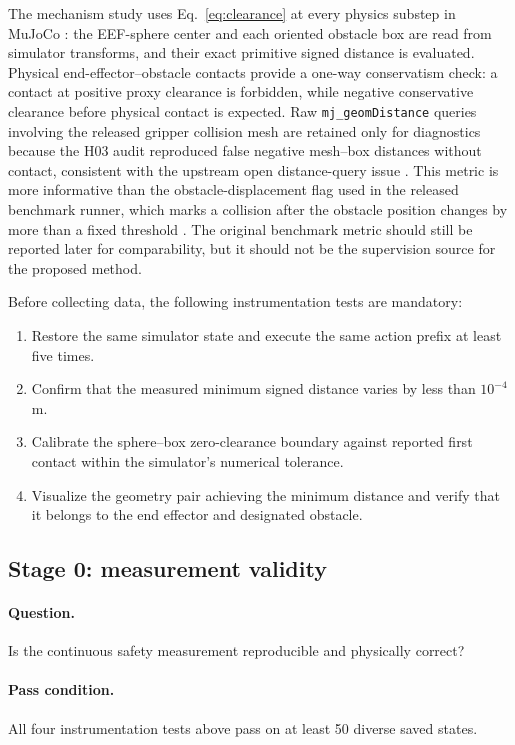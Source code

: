 \documentclass[10pt,conference]{IEEEtran}
\newcommand{\1}{\mathbf{1}}
\begin{document}
The mechanism study uses Eq.~\eqref{eq:clearance} at every physics substep in MuJoCo \cite{todorov2012mujoco}: the EEF-sphere center and each oriented obstacle box are read from simulator transforms, and their exact primitive signed distance is evaluated. Physical end-effector--obstacle contacts provide a one-way conservatism check: a contact at positive proxy clearance is forbidden, while negative conservative clearance before physical contact is expected. Raw \texttt{mj\_geomDistance} queries involving the released gripper collision mesh are retained only for diagnostics because the H03 audit reproduced false negative mesh--box distances without contact, consistent with the upstream open distance-query issue \cite{mujocoissue1784}. This metric is more informative than the obstacle-displacement flag used in the released benchmark runner, which marks a collision after the obstacle position changes by more than a fixed threshold \cite{vlsarepo}. The original benchmark metric should still be reported later for comparability, but it should not be the supervision source for the proposed method.

Before collecting data, the following instrumentation tests are mandatory:
\begin{enumerate}[leftmargin=*,nosep]
    \item Restore the same simulator state and execute the same action prefix at least five times.
    \item Confirm that the measured minimum signed distance varies by less than $10^{-4}$ m.
    \item Calibrate the sphere--box zero-clearance boundary against reported first contact within the simulator's numerical tolerance.
    \item Visualize the geometry pair achieving the minimum distance and verify that it belongs to the end effector and designated obstacle.
\end{enumerate}

\subsection{Stage 0: measurement validity}

\paragraph{Question.} Is the continuous safety measurement reproducible and physically correct?

\paragraph{Pass condition.} All four instrumentation tests above pass on at least 50 diverse saved states.
\end{document}
